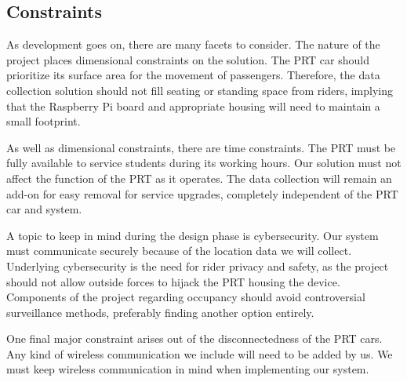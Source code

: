 \subsection{Constraints}
As development goes on, there are many facets to consider. The nature of the project places dimensional constraints on the solution. The PRT car should prioritize its surface area for the movement of passengers. Therefore, the data collection solution should not fill seating or standing space from riders, implying that the Raspberry Pi board and appropriate housing will need to maintain a small footprint.

As well as dimensional constraints, there are time constraints. The PRT must be fully available to service students during its working hours. Our solution must not affect the function of the PRT as it operates. The data collection will remain an add-on for easy removal for service upgrades, completely independent of the PRT car and system.
	
A topic to keep in mind during the design phase is cybersecurity. Our system must communicate securely because of the location data we will collect. Underlying cybersecurity is the need for rider privacy and safety, as the project should not allow outside forces to hijack the PRT housing the device. Components of the project regarding occupancy should avoid controversial surveillance methods, preferably finding another option entirely.
	
One final major constraint arises out of the disconnectedness of the PRT cars. Any kind of wireless communication we include will need to be added by us. We must keep wireless communication in mind when implementing our system.
